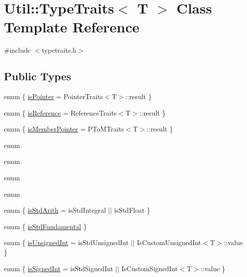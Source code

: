 \hypertarget{classUtil_1_1TypeTraits}{}\section{Util\+:\+:Type\+Traits$<$ T $>$ Class Template Reference}
\label{classUtil_1_1TypeTraits}


{\ttfamily \#include $<$typetraits.\+h$>$}

\subsection*{Public Types}
\begin{DoxyCompactItemize}
\item 
enum \{ \mbox{\hyperlink{classUtil_1_1TypeTraits_ad589492a3d9a9a4fd5154de3efb032c1a0813f58ed7af0a00a07d0ba641cc3bba}{is\+Pointer}} = Pointer\+Traits$<$T$>$\+:\+:result
 \}
\item 
enum \{ \mbox{\hyperlink{classUtil_1_1TypeTraits_a0839bb273e8995e087dfec963f330b46ac0cdaf0e77f765430820e96bb7cf4619}{is\+Reference}} = Reference\+Traits$<$T$>$\+:\+:result
 \}
\item 
enum \{ \mbox{\hyperlink{classUtil_1_1TypeTraits_aee8735f108bb235c2d59b8b823e04086abe04caa758890fee25930d96123265d2}{is\+Member\+Pointer}} = P\+To\+M\+Traits$<$T$>$\+:\+:result
 \}
\item 
enum 
\item 
enum 
\item 
enum 
\item 
enum 
\item 
enum \{ \mbox{\hyperlink{classUtil_1_1TypeTraits_abfcd1f4b7a5011b6ea8b965d1b46e54ea3017f19abc6084d7e144891aaf5adb0f}{is\+Std\+Arith}} = is\+Std\+Integral $\vert$$\vert$ is\+Std\+Float
 \}
\item 
enum \{ \mbox{\hyperlink{classUtil_1_1TypeTraits_ae92d99a34daca0ca219bbab6663bb6beab40fb122d222179d83db4acfdd8d3887}{is\+Std\+Fundamental}}
 \}
\item 
enum \{ \mbox{\hyperlink{classUtil_1_1TypeTraits_acc7cc813299fef607c83811df9588ceaa491d7fd4750cb0d1a2dcbeb5fc3456d1}{is\+Unsigned\+Int}} = is\+Std\+Unsigned\+Int $\vert$$\vert$ Is\+Custom\+Unsigned\+Int$<$T$>$\+:\+:value
 \}
\item 
enum \{ \mbox{\hyperlink{classUtil_1_1TypeTraits_a04632ebd2ca449c48e23e0467e6dc286a238eb902c14c6c61c1f4baa46e56c461}{is\+Signed\+Int}} = is\+Std\+Signed\+Int $\vert$$\vert$ Is\+Custom\+Signed\+Int$<$T$>$\+:\+:value
 \}
\item 
$$
\end{DoxyCompactItemize}
